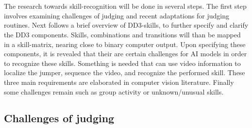 \chapter{}%
\label{ch:stand-van-zaken}



The research towards skill-recognition will be done in several steps.
The first step involves examining challenges of judging and recent adaptations for judging routines.
Next follows a brief overview of DD3-skills, to further specify and clarify the DD3 components.
Skills, combinations and transitions will than be mapped in a skill-matrix, nearing close to binary computer output.
Upon specifying these components, it is revealed that their are certain challenges for AI models in order to recognize these skills.
Something is needed that can use video information to localize the jumper, sequence the video, and recognize the performed skill.
These three main requirements are elaborated in computer vision literature. %
Finally some challenges remain such as group activity or unknown/unusual skills.



\section{Challenges of judging}
\label{subsubsec:bp-literature-judge-challenges}

